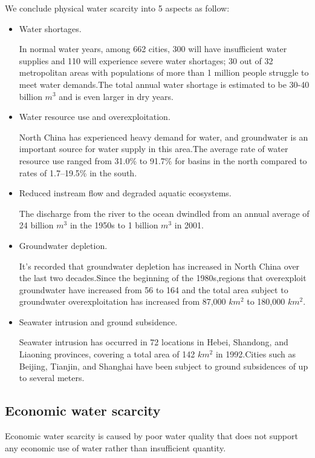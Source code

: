 We conclude physical water scarcity into 5 aspects as follow:
\begin{itemize}
\item Water shortages.

In normal water years, among 662 cities, 300 will have insufficient water supplies and 110 will experience severe water shortages; 30 out of 32 metropolitan areas with populations of more than 1 million people struggle to meet water demands.\cite{Li2006}The total annual water shortage is estimated to be 30-40 billion $m^3$ and is even larger in dry years.\cite{MWR2007b}

\item Water resource use and overexploitation.

North China has experienced heavy demand for water, and groundwater is an important source for water supply in this area.The average rate of water resource use ranged from 31.0\% to 91.7\% for basins in the north compared to rates of 1.7–19.5\% in the south.\cite{MWR2007a}

\item Reduced instream flow and degraded aquatic ecosystems.

The discharge from the river to the ocean dwindled from an annual average of 24 billion $m^3$ in the 1950s to 1 billion $m^3$ in 2001.\cite{Xia2007}

\item Groundwater depletion.

It's recorded that groundwater depletion has increased in North China over the last two decades.Since the beginning of the 1980s,regions that overexploit groundwater have increased from 56 to 164 and the total area subject to groundwater overexploitation has increased from 87,000 $km^2$ to 180,000 $km^2$.\cite{MWR2007b}

\item Seawater intrusion and ground subsidence.

Seawater intrusion has occurred in 72 locations in Hebei, Shandong, and Liaoning provinces, covering a total area of 142 $km^2$ in 1992.\cite{WB2001}Cities such as Beijing, Tianjin, and Shanghai have been subject to ground subsidences of up to several meters.\cite{Shalizi2006}
\end{itemize}

\subsection{Economic water scarcity}
Economic water scarcity is caused by poor water quality that does not support any economic use of water rather than insufficient quantity.

